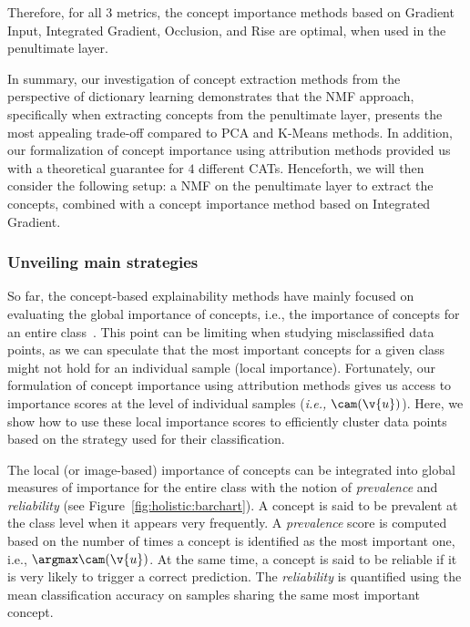 Therefore, for all $3$ metrics, the concept importance methods based on Gradient Input, Integrated Gradient, Occlusion, and Rise are optimal, when used in the penultimate layer.

In summary, our investigation of concept extraction methods from the perspective of dictionary learning demonstrates that the NMF approach, specifically when extracting concepts from the penultimate layer, presents the most appealing trade-off compared to PCA and K-Means methods. In addition, our formalization of concept importance using attribution methods provided us with a theoretical guarantee for $4$ different CATs. Henceforth, we will then consider the following setup: a NMF on the penultimate layer to extract the concepts, combined with a concept importance method based on Integrated Gradient.

\subsubsection{Unveiling main strategies}

So far, the concept-based explainability methods have mainly focused on evaluating the global importance of concepts, i.e., the importance of concepts for an entire class~\cite{kim2018interpretability,fel2023craft}. This point can be limiting when studying misclassified data points, as we can speculate that the most important concepts for a given class might not hold for an individual sample (local importance). Fortunately, our formulation of concept importance using attribution methods gives us access to importance scores at the level of individual samples (\textit{i.e.,} $\cam(\v{u})$). Here, we show how to use these local importance scores to efficiently cluster data points based on the strategy used for their classification. 

The local (or image-based) importance of concepts can be integrated into global measures of importance for the entire class with the notion of \textit{prevalence} and \textit{reliability} (see Figure~\ref{fig:holistic:barchart}). A concept is said to be prevalent at the class level when it appears very frequently. A \textit{prevalence} score is computed based on the number of times a concept is identified as the most important one, i.e., $\argmax \cam(\v{u})$. At the same time, a concept is said to be reliable if it is very likely to trigger a correct prediction. The \textit{reliability} is quantified using the mean classification accuracy on samples sharing the same most important concept.



